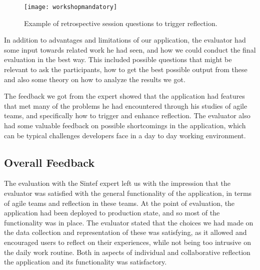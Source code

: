 \begin{figure}[H]
    \centering
        \texttt{[image: workshopmandatory]}
    \caption{Example of retrospective session questions to trigger reflection.}
    \label{workshopmandatoryexpertreview}
\end{figure}

In addition to advantages and limitations of our application, the evaluator had some input towards related work he had seen, and how we could conduct the final evaluation in the best way. This included possible questions that might be relevant to ask the participants, how to get the best possible output from these and also some theory on how to analyze the results we got.

The feedback we got from the expert showed that the application had features that met many of the problems he had encountered through his studies of agile teams, and specifically how to trigger and enhance reflection. The evaluator also had some valuable feedback on possible shortcomings in the application, which can be typical challenges developers face in a day to day working environment. 

\subsection{Overall Feedback}
The evaluation with the Sintef expert left us with the impression that the evaluator was satisfied with the general functionality of the application, in terms of agile teams and reflection in these teams. 
At the point of evaluation, the application had been deployed to production state, and so most of the functionality was in place. The evaluator stated that the choices we had made on the data collection and representation of these was satisfying, as it allowed and encouraged users to reflect on their experiences, while not being too intrusive on the daily work routine. Both in aspects of individual and collaborative reflection the application and its functionality was satisfactory. 


